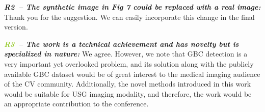 \documentclass[10pt,twocolumn,letterpaper]{article}
\newcommand{\rb}{\textcolor{PineGreen}{R2}}
\newcommand{\rc}{\textcolor{YellowGreen}{R3}}
\newcommand{\myfirstpara}[1]{\noindent \textbf{\textit{#1:}}}
\newcommand{\mypara}[1]{\vspace{0.1em} \myfirstpara{#1}}
\begin{document}
\mypara{\rb ~-- The synthetic image in Fig 7 could be replaced with a real image}
%
Thank you for the suggestion. We can easily incorporate this change in the final version.

\mypara{\rc ~-- The work is a technical achievement and has novelty but is specialized in nature}
%
We agree. However, we note that GBC detection is a very important yet overlooked problem, and its solution along with the publicly available GBC dataset would be of great interest to the medical imaging audience of the CV community. Additionally, the novel methods introduced in this work would be suitable for USG imaging modality, and therefore, the work would be an appropriate contribution to the conference.


% 
% 
\end{document}

